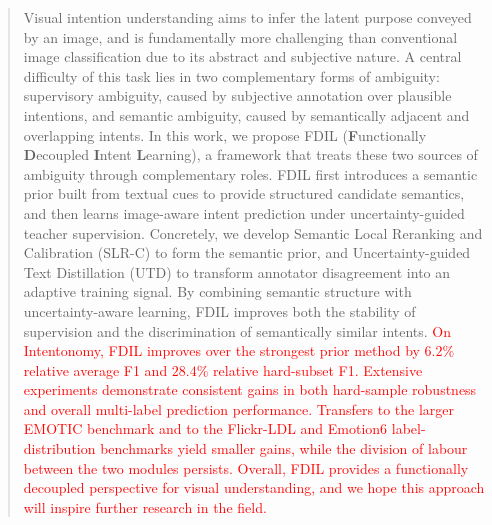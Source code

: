 \documentclass[times,review,10pt]{elsarticle}
\newcommand{\revised}[1]{\textcolor{red}{#1}}
\begin{document}
\begin{frontmatter}

\begin{abstract}
Visual intention understanding aims to infer the latent purpose conveyed by an image, and is fundamentally more challenging than conventional image classification due to its abstract and subjective nature. A central difficulty of this task lies in two complementary forms of ambiguity: supervisory ambiguity, caused by subjective annotation over plausible intentions, and semantic ambiguity, caused by semantically adjacent and overlapping intents.
In this work, we propose FDIL (\textbf{F}unctionally \textbf{D}ecoupled \textbf{I}ntent \textbf{L}earning), a framework that treats these two sources of ambiguity through complementary roles. FDIL first introduces a semantic prior built from textual cues to provide structured candidate semantics, and then learns image-aware intent prediction under uncertainty-guided teacher supervision. Concretely, we develop Semantic Local Reranking and Calibration (SLR-C) to form the semantic prior, and Uncertainty-guided Text Distillation (UTD) to transform annotator disagreement into an adaptive training signal. By combining semantic structure with uncertainty-aware learning, FDIL improves both the stability of supervision and the discrimination of semantically similar intents. \revised{On Intentonomy, FDIL improves over the strongest prior method by $6.2\%$ relative average F1 and $28.4\%$ relative hard-subset F1. Extensive experiments demonstrate consistent gains in both hard-sample robustness and overall multi-label prediction performance. Transfers to the larger EMOTIC benchmark and to the Flickr-LDL and Emotion6 label-distribution benchmarks yield smaller gains, while the division of labour between the two modules persists. Overall, FDIL provides a functionally decoupled perspective for visual understanding, and we hope this approach will inspire further research in the field.}
\end{abstract}




\end{frontmatter}
\end{document}
